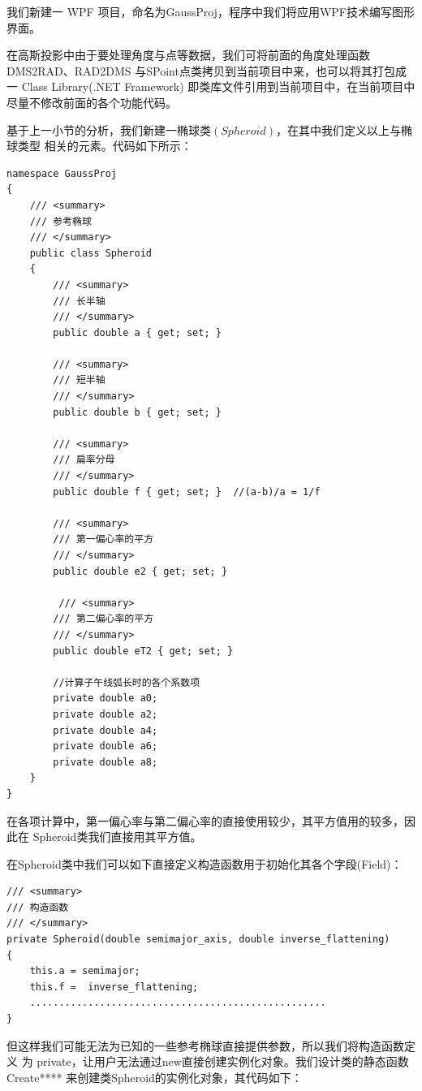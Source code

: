 我们新建一 WPF 项目，命名为GaussProj，程序中我们将应用WPF技术编写图形界面。

在高斯投影中由于要处理角度与点等数据，我们可将前面的角度处理函数DMS2RAD、RAD2DMS
与SPoint点类拷贝到当前项目中来，也可以将其打包成一 Class Library(.NET Framework)
即类库文件引用到当前项目中，在当前项目中尽量不修改前面的各个功能代码。

基于上一小节的分析，我们新建一椭球类$(Spheroid)$，在其中我们定义以上与椭球类型
相关的元素。代码如下所示：

\begin{lstlisting}
namespace GaussProj
{
    /// <summary>
    /// 参考椭球
    /// </summary>
    public class Spheroid
    {
        /// <summary>
        /// 长半轴
        /// </summary>
        public double a { get; set; }

        /// <summary>
        /// 短半轴
        /// </summary>
        public double b { get; set; }

        /// <summary>
        /// 扁率分母
        /// </summary>
        public double f { get; set; }  //(a-b)/a = 1/f

        /// <summary>
        /// 第一偏心率的平方
        /// </summary>
        public double e2 { get; set; }

         /// <summary>
        /// 第二偏心率的平方
        /// </summary>
        public double eT2 { get; set; }

        //计算子午线弧长时的各个系数项
        private double a0;
        private double a2;
        private double a4;
        private double a6;
        private double a8;
    }
}
\end{lstlisting}

在各项计算中，第一偏心率与第二偏心率的直接使用较少，其平方值用的较多，因此在
Spheroid类我们直接用其平方值。

 在Spheroid类中我们可以如下直接定义构造函数用于初始化其各个字段(Field)：
  \begin{lstlisting}
/// <summary>
/// 构造函数
/// </summary>
private Spheroid(double semimajor_axis, double inverse_flattening)
{
    this.a = semimajor;
    this.f =  inverse_flattening;
    ...................................................
}
\end{lstlisting}

但这样我们可能无法为已知的一些参考椭球直接提供参数，所以我们将构造函数定义
为 private，让用户无法通过new直接创建实例化对象。我们设计类的静态函数
Create**** 来创建类Spheroid的实例化对象，其代码如下：

